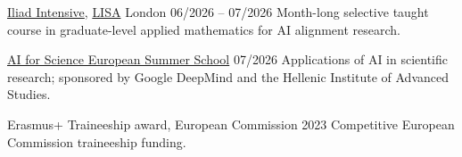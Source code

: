 
  {\href{https://www.lesswrong.com/posts/moG6k8mJiGvH4zc8j/what-is-the-iliad-intensive}{Iliad Intensive}, \href{https://www.safeai.org.uk}{LISA} London}
  {06/2026 -- 07/2026}
  {Month-long selective taught course in graduate-level applied mathematics for AI alignment research.}

  {\href{https://www.aiforscience.school}{AI for Science European Summer School}}
  {07/2026}
  {Applications of AI in scientific research; sponsored by Google DeepMind and the Hellenic
   Institute of Advanced Studies.}

  {Erasmus+ Traineeship award, European Commission}
  {2023}
  {Competitive European Commission traineeship funding.}
